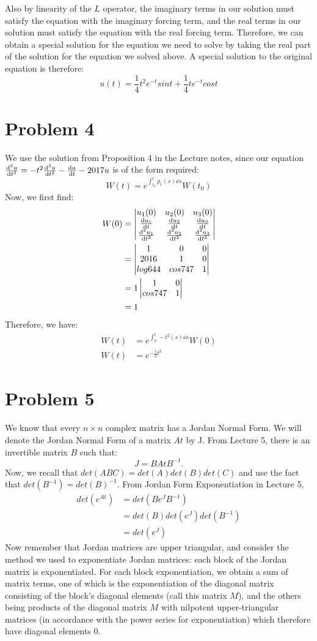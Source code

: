 \documentclass[11pt]{article}
\begin{document}
Also by linearity of the $L$ operator, the imaginary terms in our solution must satisfy the equation with the imaginary forcing term, and the real terms in our solution must satisfy the equation with the real forcing term. Therefore, we can obtain a special solution for the equation we need to solve by taking the real part of the solution for the equation we solved above. A special solution to the original equation is therefore:
\[
u(t) = \frac{1}{4} t^2 e^{-t} sin t + \frac{1}{4} te^{-t} cos t
\]

\section*{Problem 4}
We use the solution from Proposition 4 in the Lecture notes, since our equation $\dv[3]{u}{t} = -t^2 \dv[2]{u}{t} - \dv{u}{t} - 2017u$ is of the form required:
\[
W(t) = e^{\int_{t_0}^t p_1 (s) \dd{s}} W(t_0)
\]
Now, we first find:
\begin{align*}
W(0) &= \mdet{u_1(0) & u_2(0) & u_3(0) \\ \dv{u_1}{t}(0) & \dv{u_2}{t}(0) & \dv{u_3}{t}(0) \\ \dv[2]{u_1}{t}(0) & \dv[2]{u_2}{t}(0) & \dv[2]{u_3}{t}(0)} \\
&= \mdet{1 & 0 & 0 \\ 2016 & 1 & 0 \\ log644 & cos747 & 1} \\
&= 1\mdet{1 & 0 \\ cos747 & 1}\\
&= 1
\end{align*}
Therefore, we have:
\begin{align*}
W(t) &= e^{\int_{0}^t -t^2 (s) \dd{s}} W(0) \\
W(t) &= e^{-\frac{1}{3} t^3}
\end{align*}

\section*{Problem 5}
We know that every $n \times n$ complex matrix has a Jordan Normal Form. We will denote the Jordan Normal Form of a matrix $At$ by J. From Lecture 5, there is an invertible matrix $B$ such that:
\[
J = B At B^{-1}.
\]
Now, we recall  that $det(ABC) = det(A) det(B) det(C)$ and use the fact that $det(B^{-1}) = det(B)^{-1}$. 
From Jordan Form Exponentiation in Lecture 5,
\begin{align*}
det(e^{At}) &= det(B e^J B^{-1}) \\
&= det(B) det(e^J) det(B^{-1}) \\
&= det(e^J)
\end{align*}
Now remember that Jordan matrices are upper triangular, and consider the method we used to exponentiate Jordan matrices: each block of the Jordan matrix is exponentiated. For each block exponentiation, we obtain a sum of matrix terms, one of which is the exponentiation of the diagonal matrix consisting of the block's diagonal elements (call this matrix $M$), and the others being products of the diagonal matrix $M$ with nilpotent upper-triangular matrices (in accordance with the power series for exponentiation) which therefore have diagonal elements 0.
\end{document}
